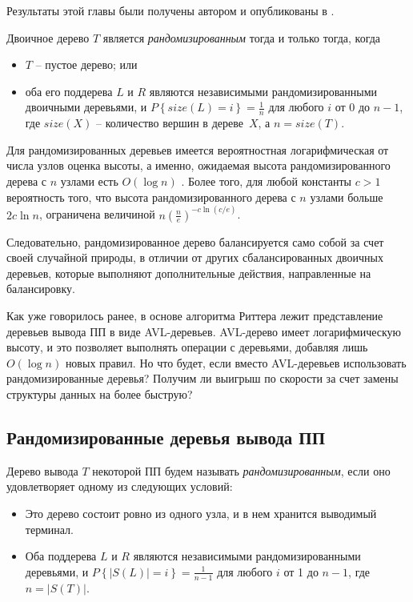 \documentclass[14pt]{article}
\begin{document}
Результаты этой главы были получены автором и опубликованы в \cite{OurPracticalTest}.

Двоичное дерево $T$ является {\it рандомизированным} тогда и только тогда,
когда 
\begin{itemize}
	\item $T$ -- пустое дерево; или
	\item оба его поддерева $L$ и $R$ являются независимыми рандомизированными двоичными деревьями, и
$P\left\{size(L)=i\right\} = \frac{1}{n}$ для любого $i$ от 0 до $n-1$, где $size(X)$ -- количество вершин в дереве~$X$, а $n = size(T)$.
\end{itemize}

Для рандомизированных деревьев имеется вероятностная логарифмическая от числа узлов оценка высоты, а
именно, ожидаемая высота рандомизированного дерева с $n$ узлами есть $O(\log n)$ \cite{Seidel&Aragon:1996}.
Более того, для любой константы $c>1$ вероятность того, что высота рандомизированного дерева с $n$ узлами больше $2c\ln n$,
ограничена величиной $n\left(\frac{n}{e}\right)^{-c\ln(c/e)}$.

Следовательно, рандомизированное дерево балансируется само собой за счет своей случайной природы, в отличии
от других сбалансированных двоичных деревьев, которые выполняют дополнительные действия, направленные на балансировку.

Как уже говорилось ранее, в основе алгоритма Риттера лежит представление деревьев вывода ПП в виде AVL-деревьев.
AVL-дерево имеет логарифмическую высоту, и это позволяет выполнять операции с деревьями, добавляя лишь $O(\log n)$ новых правил.
Но что будет, если вместо AVL-деревьев использовать рандомизированные деревья? Получим ли выигрыш по скорости
за счет замены структуры данных на более быструю?

\subsection{Рандомизированные деревья вывода ПП}

Дерево вывода $T$ некоторой ПП будем называть {\it рандомизированным}, если
оно удовлетворяет одному из следующих условий:
\begin{itemize}
	\item Это дерево состоит ровно из одного узла, и в нем хранится выводимый терминал.
	\item Оба поддерева $L$ и $R$ являются независимыми рандомизированными деревьями, и 
	$P\left\{\left|S(L)\right| = i\right\} = \frac{1}{n-1}$ для любого $i$ от 1 до $n-1$, где $n = |S(T)|$.
\end{itemize}
\end{document}
